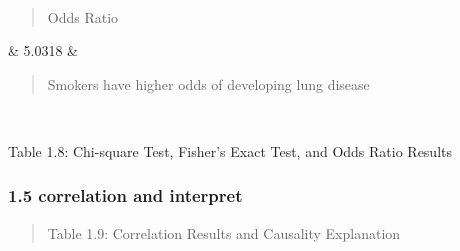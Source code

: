 {\begin{longtable}[]
{\begin{minipage}[t]{\linewidth}
\end{minipage}} \\
\begin{minipage}[t]{\linewidth}\raggedright
\begin{quote}
Odds Ratio
\end{quote}
\end{minipage} & 5.0318 & \begin{minipage}[t]{\linewidth}\raggedright
\begin{quote}
Smokers have higher odds of developing lung disease
\end{quote}
\end{minipage} \\
\end{longtable}
}

Table 1.8: Chi-square Test, Fisher's Exact Test, and Odds Ratio Results

\subsubsection{1.5 correlation and
interpret}\label{correlation-and-interpret}

\begin{quote}
Table 1.9: Correlation Results and Causality Explanation
\end{quote}

